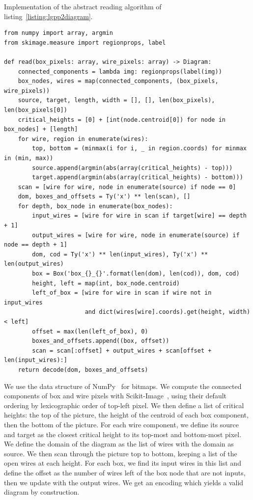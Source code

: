 \begin{python}
{\normalfont Implementation of the abstract reading algorithm of listing~\ref{listing:lgpp2diagram}.}

\begin{verbatim}
from numpy import array, argmin
from skimage.measure import regionprops, label

def read(box_pixels: array, wire_pixels: array) -> Diagram:
    connected_components = lambda img: regionprops(label(img))
    box_nodes, wires = map(connected_components, (box_pixels, wire_pixels))
    source, target, length, width = [], [], len(box_pixels), len(box_pixels[0])
    critical_heights = [0] + [int(node.centroid[0]) for node in box_nodes] + [length]
    for wire, region in enumerate(wires):
        top, bottom = (minmax(i for i, _ in region.coords) for minmax in (min, max))
        source.append(argmin(abs(array(critical_heights) - top)))
        target.append(argmin(abs(array(critical_heights) - bottom)))
    scan = [wire for wire, node in enumerate(source) if node == 0]
    dom, boxes_and_offsets = Ty('x') ** len(scan), []
    for depth, box_node in enumerate(box_nodes):
        input_wires = [wire for wire in scan if target[wire] == depth + 1]
        output_wires = [wire for wire, node in enumerate(source) if node == depth + 1]
        dom, cod = Ty('x') ** len(input_wires), Ty('x') ** len(output_wires)
        box = Box('box_{}_{}'.format(len(dom), len(cod)), dom, cod)
        height, left = map(int, box_node.centroid)
        left_of_box = [wire for wire in scan if wire not in input_wires
                       and dict(wires[wire].coords).get(height, width) < left]
        offset = max(len(left_of_box), 0)
        boxes_and_offsets.append((box, offset))
        scan = scan[:offset] + output_wires + scan[offset + len(input_wires):]
    return decode(dom, boxes_and_offsets)
\end{verbatim}
\end{python}

We use the  data structure of NumPy~\cite{VanDerWaltEtAl11} for bitmaps.
We compute the connected components of box and wire pixels with Scikit-Image~\cite{WaltEtAl14}, using their default ordering by lexicographic order of top-left pixel.
We then define a list of critical heights: the top of the picture, the height of the centroid of each box component, then the bottom of the picture.
For each wire component, we define its source and target as the closest critical height to its top-most and bottom-most pixel.
We define the domain of the diagram as the list of wires with the domain as source.
We then scan through the picture top to bottom, keeping a list  of the open wires at each height.
For each box, we find its input wires in this list and define the offset as the number of wires left of the box node that are not inputs, then we update  with the output wires.
We get an encoding  which yields a valid diagram by construction.

